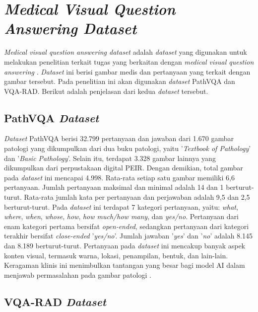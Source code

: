 \section{\textit{Medical Visual Question Answering Dataset}}

\par \textit{Medical visual question answering dataset} adalah \textit{dataset} yang digunakan untuk melakukan penelitian terkait tugas yang berkaitan dengan \textit{medical visual question answering} \citep{lin2023medical}. \textit{Dataset} ini berisi gambar medis dan pertanyaan yang terkait dengan gambar tersebut. Pada penelitian ini akan digunakan \textit{dataset} PathVQA dan VQA-RAD. Berikut adalah penjelasan dari kedua \textit{dataset} tersebut.

\subsection{PathVQA \textit{Dataset}}

\par \textit{Dataset} PathVQA berisi 32.799 pertanyaan dan jawaban dari 1.670 gambar patologi yang dikumpulkan dari dua buku patologi, yaitu '\textit{Textbook of Pathology}' dan '\textit{Basic Pathology}'. Selain itu, terdapat 3.328 gambar lainnya yang dikumpulkan dari perpustakaan digital PEIR. Dengan demikian, total gambar pada \textit{dataset} ini mencapai 4.998. Rata-rata setiap satu gambar memiliki 6,6 pertanyaan. Jumlah pertanyaan maksimal dan minimal adalah 14 dan 1 berturut-turut. Rata-rata jumlah kata per pertanyaan dan perjawaban adalah 9,5 dan 2,5 berturut-turut. Pada \textit{dataset} ini terdapat 7 kategori pertanyaan, yaitu: \textit{what}, \textit{where}, \textit{when}, \textit{whose}, \textit{how}, \textit{how much/how many}, dan \textit{yes/no}. Pertanyaan dari enam kategori pertama bersifat \textit{open-ended}, sedangkan pertanyaan dari kategori terakhir bersifat \textit{close-ended} '\textit{yes/no}'. Jumlah jawaban '\textit{yes}' dan '\textit{no}' adalah 8.145 dan 8.189 berturut-turut. Pertanyaan pada \textit{dataset} ini mencakup banyak aspek konten visual, termasuk warna, lokasi, penampilan, bentuk, dan lain-lain. Keragaman klinis ini menimbulkan tantangan yang besar bagi model AI dalam menjawab permasalahan pada gambar patologi \citep{xuehai2020pathvqa}.


\subsection{VQA-RAD \textit{Dataset}}

